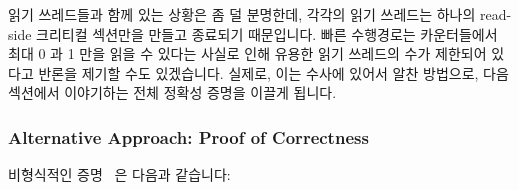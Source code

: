 읽기 쓰레드들과 함께 있는 상황은 좀 덜 분명한데, 각각의 읽기 쓰레드는 하나의
read-side 크리티컬 섹션만을 만들고 종료되기 때문입니다.
빠른 수행경로는 카운터들에서 최대 0 과 1 만을 읽을 수 있다는 사실로 인해 유용한
읽기 쓰레드의 수가 제한되어 있다고 반론을 제기할 수도 있겠습니다.
실제로, 이는 수사에 있어서 알찬 방법으로, 다음 섹션에서 이야기하는 전체 정확성
증명을 이끌게 됩니다.
\iffalse

One approach is to look carefully at the Promela code for
\co{qrcu_updater()} and notice that the only global state
change is happening under the lock.
Therefore, only one updater at a time can possibly be modifying
state visible to either readers or other updaters.
This means that any sequences of state changes can be carried
out serially by a single updater due to the fact that Promela does a full
state-space search.
Therefore, at most two updaters are required: one to change state
and a second to become confused.

The situation with the readers is less clear-cut, as each reader
does only a single read-side critical section then terminates.
It is possible to argue that the useful number of readers is limited,
due to the fact that the fastpath must see at most a zero and a one
in the counters.
This is a fruitful avenue of investigation, in fact, it leads to
the full proof of correctness described in the next section.
\fi

\subsubsection{Alternative Approach: Proof of Correctness}
\label{sec:formal:Alternative Approach: Proof of Correctness}

비형식적인 증명~\cite{PaulMcKenney2007QRCUpatch} 은 다음과 같습니다:
\iffalse

An informal proof~\cite{PaulMcKenney2007QRCUpatch}
follows:
\fi

